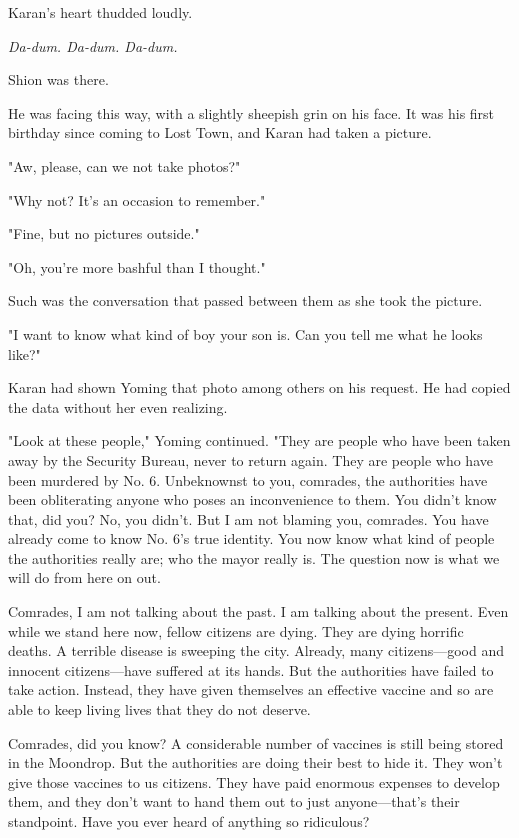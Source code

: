 Karan's heart thudded loudly.

\emph{Da-dum. Da-dum. Da-dum.}

Shion was there.

He was facing this way, with a slightly sheepish grin on his face. It
was his first birthday since coming to Lost Town, and Karan had taken a
picture.

"Aw, please, can we not take photos?"

"Why not? It's an occasion to remember."

"Fine, but no pictures outside."

"Oh, you're more bashful than I thought."

Such was the conversation that passed between them as she took the
picture.

"I want to know what kind of boy your son is. Can you tell me what he
looks like?"

Karan had shown Yoming that photo among others on his request. He had
copied the data without her even realizing.

"Look at these people," Yoming continued. "They are people who have been
taken away by the Security Bureau, never to return again. They are
people who have been murdered by No. 6. Unbeknownst to you, comrades,
the authorities have been obliterating anyone who poses an inconvenience
to them. You didn't know that, did you? No, you didn't. But I am not
blaming you, comrades. You have already come to know No. 6's true
identity. You now know what kind of people the authorities really are;
who the mayor really is. The question now is what we will do from here
on out.

Comrades, I am not talking about the past. I am talking about the
present. Even while we stand here now, fellow citizens are dying. They
are dying horrific deaths. A terrible disease is sweeping the city.
Already, many citizens---good and innocent citizens---have suffered at its
hands. But the authorities have failed to take action. Instead, they
have given themselves an effective vaccine and so are able to keep
living lives that they do not deserve.

Comrades, did you know? A considerable number of vaccines is still being
stored in the Moondrop. But the authorities are doing their best to hide
it. They won't give those vaccines to us citizens. They have paid
enormous expenses to develop them, and they don't want to hand them out
to just anyone---that's their standpoint. Have you ever heard of anything
so ridiculous?

